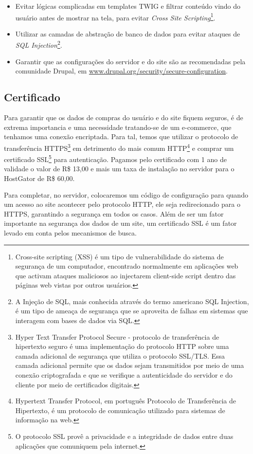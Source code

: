 \begin{itemize}
  \item Evitar lógicas complicadas em templates TWIG e filtrar conteúdo vindo do usuário antes de mostrar na tela, para evitar \textit{Cross Site Scripting}\footnote{Cross-site scripting (XSS) é um tipo de vulnerabilidade do sistema de segurança de um computador, encontrado normalmente em aplicações web que activam ataques maliciosos ao injectarem client-side script dentro das páginas web vistas por outros usuários\cite{XSS}.}.
  \item Utilizar as camadas de abstração de banco de dados para evitar ataques de \textit{SQL Injection}\footnote{A Injeção de SQL, mais conhecida através do termo americano SQL Injection, é um tipo de ameaça de segurança que se aproveita de falhas em sistemas que interagem com bases de dados via SQL\cite{SQLInjection}.}.
  \item Garantir que as configurações do servidor e do site são as recomendadas pela comunidade Drupal, em \url{www.drupal.org/security/secure-configuration}.
\end{itemize}

\subsection{Certificado}
Para garantir que os dados de compras do usuário e do site fiquem seguros, é de extrema importancia e uma necessidade tratando-se de um e-commerce, que tenhamos uma conexão encriptada. Para tal, temos que utilizar o protocolo de transferência HTTPS\footnote{Hyper Text Transfer Protocol Secure - protocolo de transferência de hipertexto seguro é uma implementação do protocolo HTTP sobre uma camada adicional de segurança que utiliza o protocolo SSL/TLS. Essa camada adicional permite que os dados sejam transmitidos por meio de uma conexão criptografada e que se verifique a autenticidade do servidor e do cliente por meio de certificados digitais.} em detrimento do mais comum HTTP\footnote{Hypertext Transfer Protocol, em português Protocolo de Transferência de Hipertexto, é um protocolo de comunicação utilizado para sistemas de informação na web\cite{HTTP}.} e comprar um certificado SSL\footnote{O protocolo SSL provê a privacidade e a integridade de dados entre duas aplicações que comuniquem pela internet\cite{SSL}.} para autenticação. Pagamos pelo certificado com 1 ano de validade o valor de R\$ 13,00 e mais um taxa de instalação no servidor para o HostGator de R\$ 60,00.

Para completar, no servidor, colocaremos um código de configuração para quando um acesso ao site acontecer pelo protocolo HTTP, ele seja redirecionado para o HTTPS, garantindo a segurança em todos os casos.
Além de ser um fator importante na segurança dos dados de um site, um certificado SSL é um fator levado em conta pelos mecanismos de busca.

